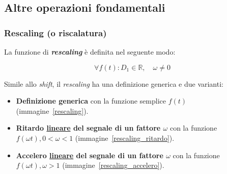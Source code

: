 \documentclass[a4paper]{article}
\begin{document}
	\newpage
	
	\subsection{Altre operazioni fondamentali}
	
	\subsubsection{Rescaling (o riscalatura)}
	
	La funzione di \textbf{\emph{rescaling}} è definita nel seguente modo:
	
	\begin{equation*}
		\forall f(t) : D_1 \in \mathbb{R}, \hspace{1em} \omega \ne 0
	\end{equation*}
	
	\noindent
	Simile allo \emph{shift}, il \emph{rescaling} ha una definizione generica e due varianti:
	
	\begin{itemize}
		\item \textbf{Definizione generica} con la funzione semplice $f(t)$ (immagine~\ref{rescaling}).
		\item \textbf{Ritardo \underline{lineare} del segnale di un fattore $\omega$} con la funzione $f(\omega t), 0 < \omega < 1$ (immagine~\ref{rescaling_ritardo}).
		\item \textbf{Accelero \underline{lineare} del segnale di un fattore $\omega$} con la funzione $f(\omega t), \omega > 1$ (immagine~\ref{rescaling_accelero}).
	\end{itemize}
	
\end{document}
